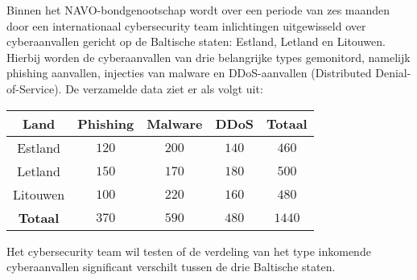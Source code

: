 \begin{question}{20}{
    Binnen het NAVO-bondgenootschap wordt over een periode van zes maanden door een internationaal cybersecurity team inlichtingen uitgewisseld over cyberaanvallen gericht op de Baltische staten: Estland, Letland en Litouwen.
    Hierbij worden de cyberaanvallen van drie belangrijke types gemonitord, namelijk phishing aanvallen, injecties van malware en DDoS-aanvallen (Distributed Denial-of-Service).
    De verzamelde data ziet er als volgt uit:


    \begin{center}
        \begin{tabular}{c|ccc|c}
            \toprule
                Land & Phishing & Malware & DDoS & \textbf{Totaal}\\
            \midrule 
                Estland & $120$ & $200$ & $140$ & $460$ \\
                Letland & $150$ & $170$ & $180$ & $500$ \\
                Litouwen & $100$ & $220$ & $160$ & $480$ \\
            \midrule
                \textbf{Totaal} & $370$ & $590$ & $480$ & $1440$ \\
            \bottomrule
        \end{tabular}
    \end{center}
    Het cybersecurity team wil testen of de verdeling van het type inkomende cyberaanvallen significant verschilt tussen de drie Baltische staten.
}

    \solution{

    }

    \solution{

    }

    \solution{

    }
\end{question}